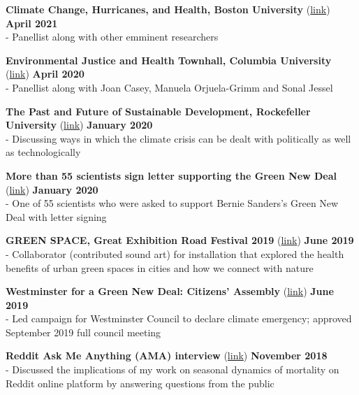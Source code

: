 \noindent \textbf{Climate Change, Hurricanes, and Health, Boston University} (\href{https://bit.ly/2TfExZb}{link}) \hfill \textbf{April 2021}\\
\noindent - Panellist along with other emminent researchers \medskip

\noindent \textbf{Environmental Justice and Health Townhall, Columbia University} (\href{https://bit.ly/3bsdZZ3}{link}) \hfill \textbf{April 2020}\\
\noindent - Panellist along with Joan Casey, Manuela Orjuela-Grimm and Sonal Jessel
\medskip

\noindent \textbf{The Past and Future of Sustainable Development, Rockefeller University} (\href{https://bit.ly/2UoPrdD}{link}) \hfill \textbf{January 2020}\\
\noindent - Discussing ways in which the climate crisis can be dealt with politically as well as technologically \medskip

\noindent \textbf{More than 55 scientists sign letter supporting the Green New Deal}  (\href{https://bit.ly/2uiY1Qz}{link}) \hfill \textbf{January 2020}\\
\noindent - One of 55 scientists who were asked to support Bernie Sanders's Green New Deal with letter signing \medskip

\noindent \textbf{GREEN SPACE, Great Exhibition Road Festival 2019} (\href{https://bit.ly/3vMnnk5}{link}) \hfill \textbf{June 2019}\\
\noindent - Collaborator (contributed sound art) for installation that explored the health benefits of urban green spaces in cities and how we connect with nature \medskip

\noindent \textbf{Westminster for a Green New Deal: Citizens' Assembly} 
(\href{https://bit.ly/2HjBxFi}{link}) \hfill \textbf{June 2019}\\
- Led campaign for Westminster Council to declare climate emergency;  approved September 2019 full council meeting \medskip

\noindent \textbf{Reddit Ask Me Anything (AMA) interview} (\href{https://bit.ly/2Qcbu5E}{link}) \hfill \textbf{November 2018}	\\
\noindent - Discussed  the implications of my work on seasonal dynamics of mortality on Reddit online platform by answering questions from the public \medskip

